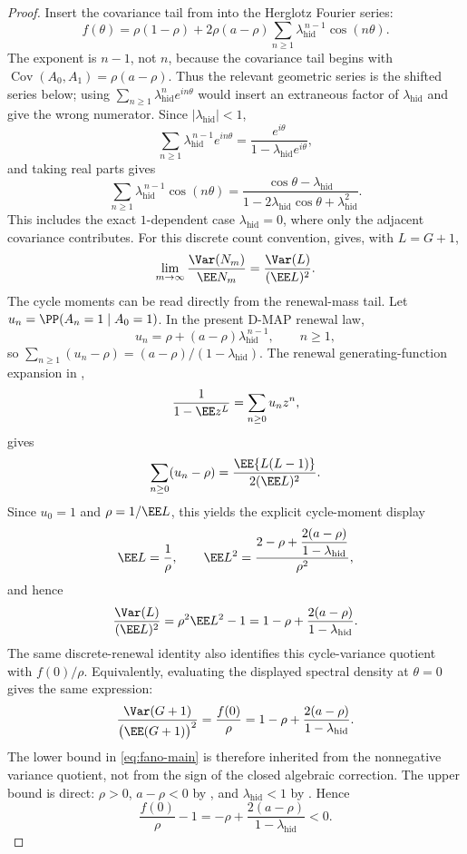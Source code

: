 \begin{proof}
Insert the covariance tail from  into the Herglotz
Fourier series:
\[
f(\theta)
=\rho(1-\rho)
+2\rho(a-\rho)\sum_{n\ge1}
\lambda_{\mathrm{hid}}^{\,n-1}\cos(n\theta).
\]
The exponent is \(n-1\), not \(n\), because the covariance tail begins with
\(\operatorname{Cov}(A_0,A_1)=\rho(a-\rho)\).  Thus the relevant geometric
series is the shifted series below; using
\(\sum_{n\ge1}\lambda_{\mathrm{hid}}^{n}e^{in\theta}\) would insert an
extraneous factor of \(\lambda_{\mathrm{hid}}\) and give the wrong numerator.
Since \(|\lambda_{\mathrm{hid}}|<1\),
\[
\sum_{n\ge1}\lambda_{\mathrm{hid}}^{\,n-1}e^{in\theta}
=
\frac{e^{i\theta}}{1-\lambda_{\mathrm{hid}}e^{i\theta}},
\]
and taking real parts gives
\[
\sum_{n\ge1}\lambda_{\mathrm{hid}}^{\,n-1}\cos(n\theta)
=
\frac{\cos\theta-\lambda_{\mathrm{hid}}}
       {1-2\lambda_{\mathrm{hid}}\cos\theta+\lambda_{\mathrm{hid}}^2}.
\]
This includes the exact \(1\)-dependent case
\(\lambda_{\mathrm{hid}}=0\), where only the adjacent covariance contributes.
For this discrete count convention,
 gives, with \(L=G+1\),
\[
\lim_{m\to\infty}\frac{\Var(N_m)}{\EE N_m}
=\frac{\Var(L)}{(\EE L)^2}.
\]
The cycle moments can be read directly from the renewal-mass tail.  Let
\(u_n=\PP(A_n=1\mid A_0=1)\).  In the present D-MAP renewal law,
\[
u_n=\rho+(a-\rho)\lambda_{\mathrm{hid}}^{\,n-1},
\qquad n\ge1,
\]
so \(\sum_{n\ge1}(u_n-\rho)=(a-\rho)/(1-\lambda_{\mathrm{hid}})\).  The
renewal generating-function expansion in
,
\[
\frac{1}{1-\EE z^L}
=\sum_{n\ge0}u_nz^n,
\]
gives
\[
\sum_{n\ge0}(u_n-\rho)
=\frac{\EE\{L(L-1)\}}{2(\EE L)^2}.
\]
Since \(u_0=1\) and \(\rho=1/\EE L\), this yields the explicit cycle-moment
display
\[
\EE L=\frac1\rho,\qquad
\EE L^2
=\frac{2-\rho+\displaystyle\frac{2(a-\rho)}
              {1-\lambda_{\mathrm{hid}}}}{\rho^2},
\]
and hence
\[
\frac{\Var(L)}{(\EE L)^2}
=\rho^2\EE L^2-1
=1-\rho+\frac{2(a-\rho)}{1-\lambda_{\mathrm{hid}}}.
\]
The same discrete-renewal identity also identifies this cycle-variance
quotient with \(f(0)/\rho\).  Equivalently, evaluating the displayed spectral
density at \(\theta=0\) gives the same expression:
\[
\frac{\Var(G+1)}{\bigl(\EE(G+1)\bigr)^2}
=\frac{f(0)}{\rho}
=1-\rho+\frac{2(a-\rho)}{1-\lambda_{\mathrm{hid}}}.
\]
The lower bound in \eqref{eq:fano-main} is therefore inherited from the
nonnegative variance quotient, not from the sign of the closed algebraic
correction.  The upper bound is direct: \(\rho>0\), \(a-\rho<0\) by
, and \(\lambda_{\mathrm{hid}}<1\) by
.  Hence
\[
\frac{f(0)}{\rho}-1
=-\rho+\frac{2(a-\rho)}{1-\lambda_{\mathrm{hid}}}<0.
\]
\end{proof}

